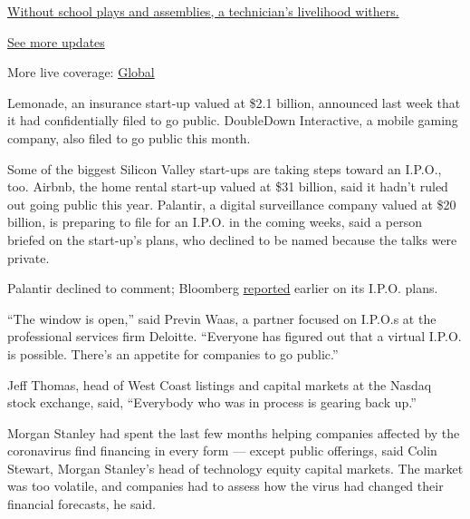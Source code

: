 \href{https://www.nytimes3xbfgragh.onion/live/2020/08/20/business/stock-market-today-coronavirus?action=click\&pgtype=Article\&state=default\&region=MAIN_CONTENT_1\&context=storylines_live_updates\#without-school-plays-and-assemblies-a-technicians-livelihood-withers}{Without
school plays and assemblies, a technician's livelihood withers.}

\href{https://www.nytimes3xbfgragh.onion/live/2020/08/20/business/stock-market-today-coronavirus?action=click\&pgtype=Article\&state=default\&region=MAIN_CONTENT_1\&context=storylines_live_updates}{See
more updates}

More live coverage:
\href{https://www.nytimes3xbfgragh.onion/2020/08/20/world/coronavirus-covid.html?action=click\&pgtype=Article\&state=default\&region=MAIN_CONTENT_1\&context=storylines_live_updates}{Global}

Lemonade, an insurance start-up valued at \$2.1 billion, announced last
week that it had confidentially filed to go public. DoubleDown
Interactive, a mobile gaming company, also filed to go public this
month.

Some of the biggest Silicon Valley start-ups are taking steps toward an
I.P.O., too. Airbnb, the home rental start-up valued at \$31 billion,
said it hadn't ruled out going public this year. Palantir, a digital
surveillance company valued at \$20 billion, is preparing to file for an
I.P.O. in the coming weeks, said a person briefed on the start-up's
plans, who declined to be named because the talks were private.

Palantir declined to comment; Bloomberg
\href{https://www.bloomberg.com/news/articles/2020-06-11/palantir-is-said-to-file-ipo-in-weeks-for-possible-fall-debut}{reported}
earlier on its I.P.O. plans.

``The window is open,'' said Previn Waas, a partner focused on I.P.O.s
at the professional services firm Deloitte. ``Everyone has figured out
that a virtual I.P.O. is possible. There's an appetite for companies to
go public.''

Jeff Thomas, head of West Coast listings and capital markets at the
Nasdaq stock exchange, said, ``Everybody who was in process is gearing
back up.''

Morgan Stanley had spent the last few months helping companies affected
by the coronavirus find financing in every form --- except public
offerings, said Colin Stewart, Morgan Stanley's head of technology
equity capital markets. The market was too volatile, and companies had
to assess how the virus had changed their financial forecasts, he said.

